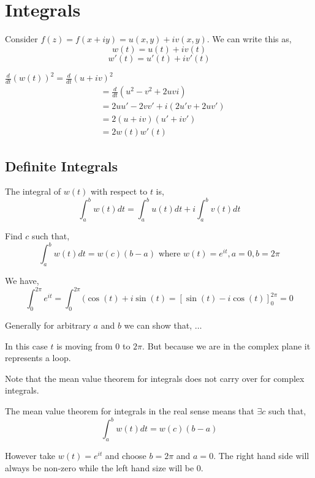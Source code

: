 \chapter{Integrals}

Consider $f(z) = f(x + iy) = u(x,y) + iv(x,y)$. We can write this as, 
$$ w(t) = u(t) + iv(t) $$ 
$$ w'(t) = u'(t) + iv'(t)  $$ 


\begin{eg}
   $\frac{d}{dt} (w(t))^2 = \frac{d}{dt} (u + iv)^2$
   \begin{align*}
    &= \frac{d}{dt}(u^2 - v^2 + 2uvi) \\
    &= 2uu' - 2vv' + i(2u'v + 2uv')  \\
    &= 2(u + iv)(u' + iv')  \\
    &= 2w(t) w'(t)  
   \end{align*}
\end{eg}

\section{Definite Integrals}
The integral of $w(t)$ with respect to  $t$ is, 
$$ \int_a^b w(t)dt = \int_a^b u(t) dt + i\int_a^b v(t) dt $$ 

\begin{ex}
   Find $c$ such that,
   $$ \int_a^b w(t) dt = w(c) (b-a) \text{ where } w(t) = e^{it}, a= 0, b = 2\pi$$ 

   \begin{solution}
      We have, 
      $$ \int_0^{2\pi} e^{it}  = \int_0^{2\pi} (\cos(t) + i\sin(t) = [\sin(t) - i \cos(t)]_0^{2\pi} = 0$$ 

      Generally for arbitrary $a$ and $b$ we can show that, $\dots$
   \end{solution}
\end{ex}

\begin{remark}
   In this case $t$ is moving from $0$ to $2\pi$. But because we are in the complex plane it represents a loop.
\end{remark}


\begin{remark}
   Note that the mean value theorem for integrals does not carry over for complex integrals.
\end{remark}
The mean value theorem for integrals in the real sense means that $\exists c $ such that, 
$$ \int_a^b w(t) dt = w(c) (b-a) $$ 

However take $w(t) = e^{it}$ and choose $b = 2\pi$ and $a = 0$. The right hand side will always be non-zero while the left hand size will be 0.






